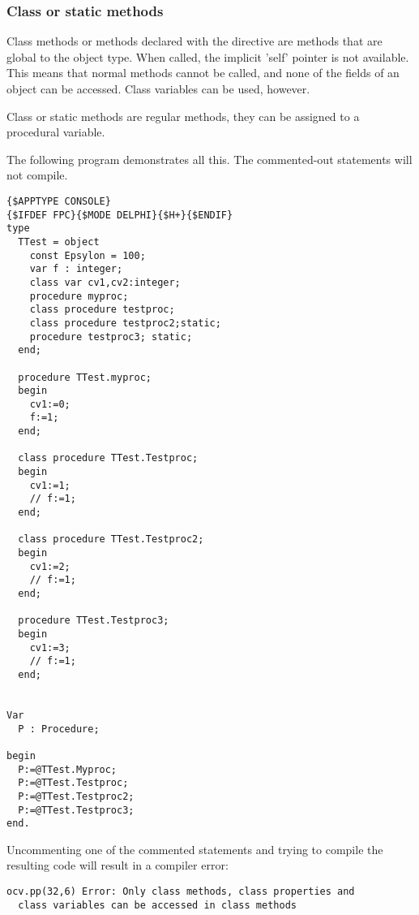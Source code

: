 \subsubsection{Class or static methods}
Class methods or methods declared with the  directive are 
methods that are global to the object type. When called, the implicit 
'self' pointer is not available. This means that normal methods cannot 
be called, and none of the fields of an object can be accessed. 
Class variables can be used, however.

Class or static methods are regular methods, they can be assigned to a procedural variable.

The following program demonstrates all this. The commented-out statements will not compile.
\begin{verbatim}
{$APPTYPE CONSOLE}
{$IFDEF FPC}{$MODE DELPHI}{$H+}{$ENDIF}
type
  TTest = object
    const Epsylon = 100;
    var f : integer;
    class var cv1,cv2:integer;
    procedure myproc;
    class procedure testproc;
    class procedure testproc2;static;
    procedure testproc3; static;
  end;

  procedure TTest.myproc;
  begin 
    cv1:=0;
    f:=1;
  end;

  class procedure TTest.Testproc;
  begin 
    cv1:=1;
    // f:=1;
  end;

  class procedure TTest.Testproc2;
  begin 
    cv1:=2;
    // f:=1;
  end;

  procedure TTest.Testproc3; 
  begin
    cv1:=3;
    // f:=1;
  end;
  

Var
  P : Procedure;  
  
begin
  P:=@TTest.Myproc;
  P:=@TTest.Testproc;
  P:=@TTest.Testproc2;
  P:=@TTest.Testproc3;
end.
\end{verbatim}
Uncommenting one of the commented statements and trying to compile the resulting code will result in a compiler error:
\begin{verbatim}
ocv.pp(32,6) Error: Only class methods, class properties and 
  class variables can be accessed in class methods
\end{verbatim}

